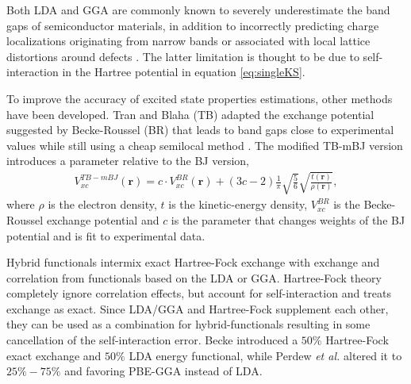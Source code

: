 Both LDA and GGA are commonly known to severely underestimate the band gaps of semiconductor materials, in addition to incorrectly predicting charge localizations originating from narrow bands or associated with local lattice distortions around defects \cite{Freysoldt2014}. The latter limitation is thought to be due to self-interaction in the Hartree potential in equation \autoref{eq:singleKS}.

To improve the accuracy of excited state properties estimations, other methods have been developed. Tran and Blaha (TB) \cite{Tran2009} adapted the exchange potential suggested by Becke-Roussel (BR) \cite{Becke2006} that leads to band gaps close to experimental values while still using a cheap semilocal method \cite{Koller2011}. The modified TB-mBJ version introduces a parameter relative to the BJ version,
\begin{align}
    V_{xc}^{TB-mBJ}(\boldsymbol{r}) =  c\cdot V_{xc}^{BR}(\boldsymbol{r}) + (3c-2) \frac{1}{\pi} \sqrt{\frac{5}{6}} \sqrt{\frac{t(\boldsymbol{r})}{\rho(\boldsymbol{r})}},
\end{align}
where $\rho$ is the electron density, $t$ is the kinetic-energy density, $V_{xc}^{BR}$ is the Becke-Roussel exchange potential and $c$ is the parameter that changes weights of the BJ potential and is fit to experimental data.

Hybrid functionals intermix exact Hartree-Fock exchange with exchange and correlation from functionals based on the LDA or GGA. Hartree-Fock theory completely ignore correlation effects, but account for self-interaction and treats exchange as exact. Since LDA/GGA and Hartree-Fock supplement each other, they can be used as a combination for hybrid-functionals resulting in some cancellation of the self-interaction error. Becke \cite{Becke1993} introduced a $50\%$ Hartree-Fock exact exchange and
$50\%$ LDA energy functional, while Perdew \textit{et al.} \cite{Perdew1996a} altered it to $25\%-75\%$ and favoring PBE-GGA instead of LDA.

